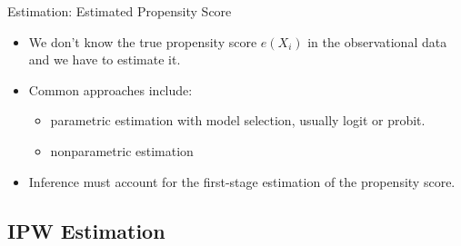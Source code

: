 \documentclass[11pt,aspectratio=169]{beamer}
\begin{document}
\begin{frame}{Estimation: Estimated Propensity Score}

\begin{itemize}
  \item We don't know the true propensity score $e(X_i)$ in the observational data and we have to estimate it.
  \item Common approaches include:
  \begin{itemize}
    \item parametric estimation with model selection, usually logit or probit.
    \item nonparametric estimation
  \end{itemize}
  \item Inference must account for the first-stage estimation of the propensity score.
  
\end{itemize}
\end{frame}


\subsection{IPW Estimation}
\end{document}
